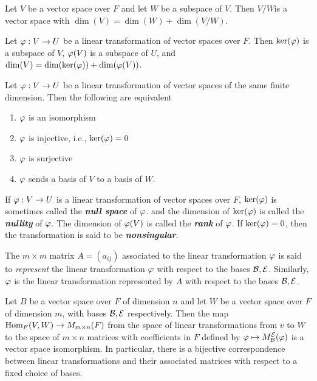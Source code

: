\nl

\begin{thm}
Let $V$ be a vector space over $F$ and let $W$ be a subspace of $V$. Then $V/W$is a vector space with $\dim(V) = \dim(W) + \dim(V/W)$.
\end{thm}

\nl

\begin{cor}
Let $\varphi:V\rightarrow U$ be a linear transformation of vector spaces over $F$. Then $\ker(\varphi)$ is a subspace of $V$, $\varphi(V)$ is a subspace of $U$, and $\dim(V) = \dim(\ker(\varphi)) + \dim(\varphi(V))$.
\end{cor}

\nl

\begin{cor}
Let $\varphi:V\rightarrow U$ be a linear transformation of vector spaces of the same finite dimension. Then the following are equivalent
\begin{enumerate}
\item $\varphi$ is an isomorphism
\item $\varphi$ is injective, i.e., $\ker(\varphi) = 0$
\item $\varphi$ is surjective
\item $\varphi$ sends a basis of $V$ to a basis of $W$.
\end{enumerate}
\end{cor}

\nl

\begin{defn}
If $\varphi:V\rightarrow U$ is a linear transformation of vector spaces over $F$, $\ker(\varphi)$ is sometimes called the \textit{\textbf{null space}} of $\varphi$. and the dimension of $\ker(\varphi)$ is called the \textit{\textbf{nullity}} of $\varphi$. The dimension of $\varphi(V)$ is called the \textit{\textbf{rank}} of $\varphi$. If $\ker(\varphi) = 0$, then the transformation is said to be \textit{\textbf{nonsingular}}.
\end{defn}

\nl

\begin{defn}
The $m \times m$ matrix $A = (a_{ij})$ associated to the linear transformation $\varphi$ is said to \textit{represent} the linear transformation $\varphi$ with respect to the bases $\mathcal{B}, \mathcal{E}$. Similarly, $\varphi$ is the linear transformation represented by $A$ with respect to the bases $\mathcal{B}, \mathcal{E}$.
\end{defn}

\nl

\begin{thm}
Let $B$ be a vector space over $F$ of dimension $n$ and let $W$ be a vector space over $F$ of dimension $m$, with bases $\mathcal{B}, \mathcal{E}$ respectively. Then the map $\text{Hom}_F(V, W)\rightarrow M_{m\times n}(F)$ from the space of linear transformations from $v$ to $W$ to the space of $m\times n$ matrices with coefficients in $F$ defined by $\varphi\mapsto M_{\mathcal{B}}^{\mathcal{E}}(\varphi)$ is a vector space isomorphism. In particular, there is a bijective correspondence between linear transformations and their associated matrices with respect to a fixed choice of bases.
\end{thm}

